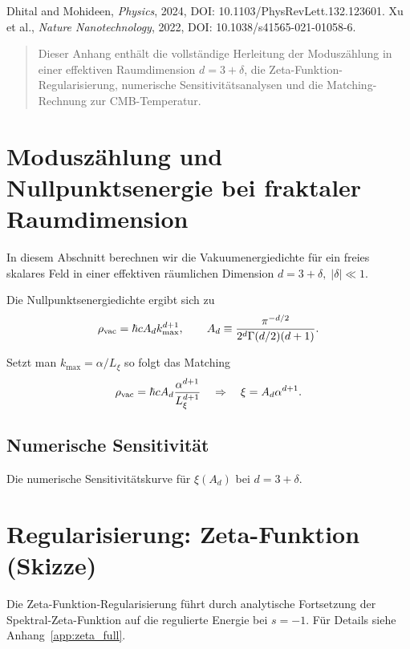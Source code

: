\documentclass[12pt,a4paper]{article}
\begin{document}
	\begin{thebibliography}{9}
		Dhital and Mohideen, \emph{Physics}, 2024, DOI: 10.1103/PhysRevLett.132.123601.
		Xu et al., \emph{Nature Nanotechnology}, 2022, DOI: 10.1038/s41565-021-01058-6.
	\end{thebibliography}

	
	\begin{abstract}
		Dieser Anhang enthält die vollständige Herleitung der Moduszählung in einer effektiven Raumdimension $d=3+\delta$, die Zeta-Funktion-Regularisierung, numerische Sensitivitätsanalysen und die Matching-Rechnung zur CMB-Temperatur. 
	\end{abstract}
	







	\section{Moduszählung und Nullpunktsenergie bei fraktaler Raumdimension}
	\label{sec:modecounting}
	
	In diesem Abschnitt berechnen wir die Vakuumenergiedichte für ein freies skalares Feld in einer effektiven räumlichen Dimension
	\(
	d=3+\delta,\;|\delta|\ll1.
	\)
	
	Die Nullpunktsenergiedichte ergibt sich zu
	\begin{equation}
		\rho_{\rm vac} = \hbar c  A_d  k_{\max}^{d+1},
		\qquad
		A_d \equiv \frac{\pi^{-d/2}}{2^d\Gamma(d/2)(d+1)}.
	\end{equation}
	
	Setzt man $k_{\max}=\alpha/L_\xi$ so folgt das Matching
	\begin{equation}
		\rho_{\rm vac} = \hbar c  A_d  \frac{\alpha^{d+1}}{L_\xi^{d+1}}
		\quad\Rightarrow\quad
		\xi = A_d \alpha^{d+1}.
	\end{equation}
	
	\subsection{Numerische Sensitivität}
	Die numerische Sensitivitätskurve für $\xi(A_d)$ bei $d=3+\delta$.
	
	\section{Regularisierung: Zeta-Funktion (Skizze)}
	Die Zeta-Funktion-Regularisierung führt durch analytische Fortsetzung der Spektral-Zeta-Funktion auf die regulierte Energie bei $s=-1$. Für Details siehe Anhang~\ref{app:zeta_full}.
	
\end{document}
